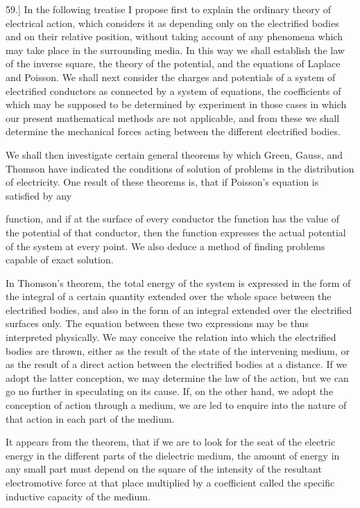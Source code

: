 \documentclass[11pt,a4paper]{article}
\begin{document}
59.] In the following treatise I propose first to explain the ordinary
theory of electrical action, which considers it as depending only
on the electrified bodies and on their relative position, without
taking account of any phenomena which may take place in the
surrounding media. In this way we shall establish the law of the
inverse square, the theory of the potential, and the equations of
Laplace and Poisson. We shall next consider the charges and
potentials of a system of electrified conductors as connected by
a system of equations, the coefficients of which may be supposed
to be determined by experiment in those cases in which our present
mathematical methods are not applicable, and from these we shall
determine the mechanical forces acting between the different
electrified bodies.

We shall then investigate certain general theorems by which
Green, Gauss, and Thomson have indicated the conditions of
solution of problems in the distribution of electricity. One result
of these theorems is, that if Poisson's equation is satisfied by any

\clearpage
\setcounter{footnote}{0}

function, and if at the surface of every conductor the function
has the value of the potential of that conductor, then the function
expresses the actual potential of the system at every point. We
also deduce a method of finding problems capable of exact solution.

In Thomson's theorem, the total energy of the system is expressed
in the form of the integral of a certain quantity extended over
the whole space between the electrified bodies, and also in the form
of an integral extended over the electrified surfaces only. The
equation between these two expressions may be thus interpreted
physically. We may conceive the relation into which the electrified
bodies are thrown, either as the result of the state of the intervening
medium, or as the result of a direct action between the electrified
bodies at a distance. If we adopt the latter conception, we may
determine the law of the action, but we can go no further in
speculating on its cause. If, on the other hand, we adopt the
conception of action through a medium, we are led to enquire into
the nature of that action in each part of the medium.

It appears from the theorem, that if we are to look for the seat
of the electric energy in the different parts of the dielectric medium,
the amount of energy in any small part must depend on the square
of the intensity of the resultant electromotive force at that place
multiplied by a coefficient called the specific inductive capacity
of the medium.
\end{document}
